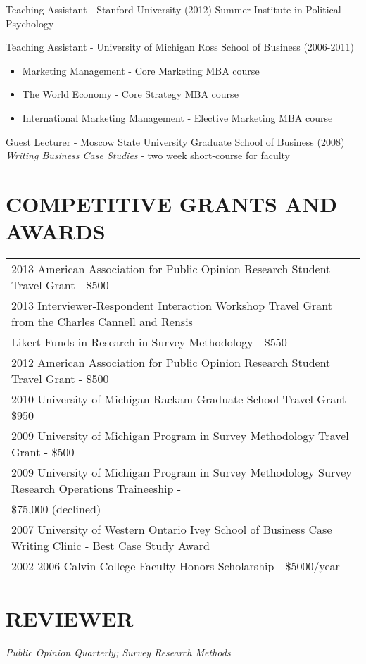 \documentclass[a4paper,10pt]{article} %
\begin{document}
Teaching Assistant - Stanford University (2012) Summer Institute in Political Psychology

Teaching Assistant  - University of Michigan Ross School of Business (2006-2011)
\begin{itemize}
\item Marketing Management - Core Marketing MBA course 
\item The World Economy - Core Strategy MBA course 
\item International Marketing Management - Elective Marketing MBA course 
\end{itemize}
Guest Lecturer - Moscow State University Graduate School of Business (2008) \textit{Writing Business Case Studies} - two week short-course for faculty 


\section{\small COMPETITIVE GRANTS AND AWARDS }
\begin{tabular}{l}

2013 American Association for Public Opinion Research Student Travel Grant - \$500
\smallskip\\
2013 Interviewer-Respondent Interaction Workshop Travel Grant from the Charles Cannell and Rensis \\ Likert Funds in Research in Survey Methodology - \$550
\smallskip\\
2012 American Association for Public Opinion Research Student Travel Grant - \$500
\smallskip\\
2010 University of Michigan Rackam Graduate School Travel Grant - \$950
\smallskip\\
2009 University of Michigan Program in Survey Methodology Travel Grant - \$500 
\smallskip\\
2009 University of Michigan Program in Survey Methodology Survey Research Operations Traineeship -\\ \$75,000 (declined)
\smallskip\\
2007 University of Western Ontario Ivey School of Business Case Writing Clinic - Best Case Study Award 
\smallskip\\
2002-2006 Calvin College Faculty Honors Scholarship - \$5000/year
\end{tabular}


\section{\small REVIEWER  }

\emph{Public Opinion Quarterly; Survey Research Methods}
\end{document}
